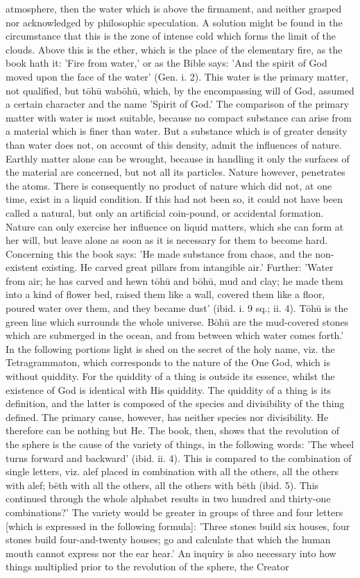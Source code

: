 \documentclass[12pt]{article}
\begin{document}
atmosphere, then the water which is above the firmament, and neither grasped nor acknowledged by philosophic speculation. A solution might be found in the circumstance that this is the zone of intense cold which forms the limit of the clouds. Above this is the ether, which is the place of the elementary fire, as the book hath it: 'Fire from water,' or as the Bible says: 'And the spirit of God moved upon the face of the water' (Gen. i. 2). This water is the primary matter, not qualified, but tōhū wabōhū, which, by the encompassing will of God, assumed a certain character and the name 'Spirit of God.' The comparison of the primary matter with water is most suitable, because no compact substance can arise from a material which is finer than water. But a substance which is of greater density than water does not, on account of this density, admit the influences of nature. Earthly matter alone can be wrought, because in handling it only the surfaces of the material are concerned, but not all its particles. Nature however, penetrates the atoms. There is consequently no product of nature which did not, at one time, exist in a liquid condition. If this had not been so, it could not have been called a natural, but only an artificial coin-pound, or accidental formation. Nature can only exercise her influence on liquid matters, which she can form at her will, but leave alone as soon as it is necessary for them to become hard. Concerning this the book says: 'He made substance from chaos, and the non-existent existing. He carved great pillars from intangible air.' Further: 'Water from air; he has carved and hewn tōhū and bōhū, mud and clay; he made them into a kind of flower bed, raised them like a wall, covered them like a floor, poured water over them, and they became dust' (ibid. i. 9 sq.; ii. 4). Tōhū is the green line which surrounds the whole universe. Bōhū are the mud-covered stones which are submerged in the ocean, and from between which water comes forth.' In the following portions light is shed on the secret of the holy name, viz. the Tetragrammaton, which corresponds to the nature of the One God, which is without quiddity. For the quiddity of a thing is outside its essence, whilst the existence of God is identical with His quiddity. The quiddity of a thing is its definition, and the latter is composed of the species and divisibility of the thing defined. The primary cause, however, has neither species nor divisibility. He therefore can be nothing but He. The book, then, shows that the revolution of the sphere is the cause of the variety of things, in the following words: 'The wheel turns forward and backward' (ibid. ii. 4). This is compared to the combination of single letters, viz. alef placed in combination with all the others, all the others with alef; bēth with all the others, all the others with bēth (ibid. 5). This continued through the whole alphabet results in two hundred and thirty-one combinations?' The variety would be greater in groups of three and four letters [which is expressed in the following formula]: 'Three stones build six houses, four stones build four-and-twenty houses; go and calculate that which the human mouth cannot express nor the ear hear.' An inquiry is also necessary into how things multiplied prior to the revolution of the sphere, the Creator 
\end{document}
